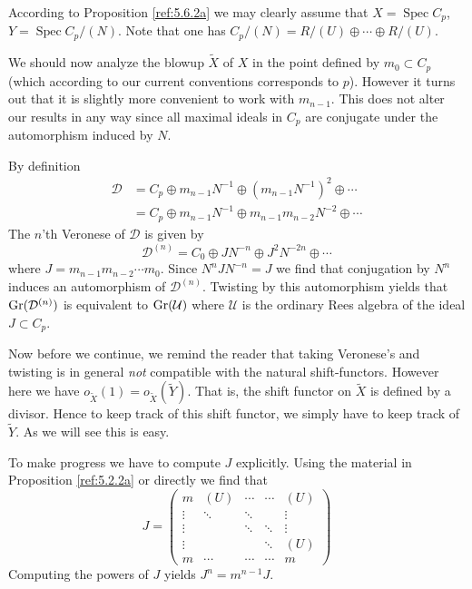 \documentclass{amsproc}
\def\Dscr{{\mathcal D}}
\def\Uscr{{\mathcal U}}
\def\Gr{\mathop{\text{Gr}}}
\def\Spec{\operatorname {Spec}}
\let\oldtext\text
\def\text#1{\oldtext{\upshape #1}}
\theoremstyle{definition}
\theoremstyle{remark}
\numberwithin{equation}{section}
\numberwithin{table}{section}
\numberwithin{figure}{section}
\def\Gr{\mathop{\text{Gr}}}
\begin{document}
According to Proposition \ref{ref:5.6.2a} we may clearly
assume that $X=\Spec C_p$, $Y=\Spec C_p/(N)$. Note that one has
$C_p/(N)=R/(U)\oplus\cdots\oplus R/(U)$.


 We should now analyze the blowup $\tilde{X}$ of
$X$ in the point defined by $m_0\subset C_p$ (which according to our current
conventions corresponds to $p$). However it turns out that it is
slightly more convenient to work with $m_{n-1}$. This does not alter
our results in any way since all  maximal ideals in $C_p$ are
conjugate under the automorphism induced by $N$.

By definition
\begin{align*}
\Dscr&=C_p\oplus m_{n-1} N^{-1} \oplus (m_{n-1}
N^{-1})^2\oplus\cdots\\
&=C_p\oplus m_{n-1} N^{-1} \oplus m_{n-1} m_{n-2} N^{-2}\oplus\cdots
\end{align*}
The $n$'th Veronese of $\Dscr$ is given by 
\[
\Dscr^{(n)}=C_0\oplus J N^{-n}\oplus J^2 N^{-2n}\oplus \cdots
\]
where $J=m_{n-1}m_{n-2}\cdots m_0$. Since $N^n J N^{-n} =J$ we find
that conjugation by $N^n$ induces an automorphism of
$\Dscr^{(n)}$. Twisting by this automorphism \cite{ATV2,Zhang}
yields that $\Gr(\Dscr^{(n)})$  is equivalent to $\Gr(\Uscr)$ where
$\Uscr$ is the ordinary Rees algebra of the ideal $J\subset C_p$.

Now before we continue, we remind the reader that
taking Veronese's and twisting is in general \emph{not} compatible with the
natural shift-functors. However here we have
$o_{\tilde{X}}(1)=o_{\tilde{X}}(\tilde{Y})$. That is, the shift
functor on $\tilde{X}$ is defined by a divisor. Hence to keep track of
this shift functor, we simply have to keep track of $\tilde{Y}$. As we
will see this is easy.

To make progress we have to compute  $J$ explicitly.
Using the material in Proposition \ref{ref:5.2.2a}
or directly we find that
\[
J=
\begin{pmatrix}
m          &(U)        &\cdots   &\cdots   &(U)      \\
\vdots     &\ddots     &\ddots   &         &\vdots   \\
\vdots     &           &\ddots   &\ddots   &\vdots   \\
\vdots     &           &         &\ddots   &(U)      \\
m          &\cdots     &\cdots   &\cdots   &m    
\end{pmatrix}
\]
Computing the powers of $J$ yields $J^n=m^{n-1} J$.
\end{document}
